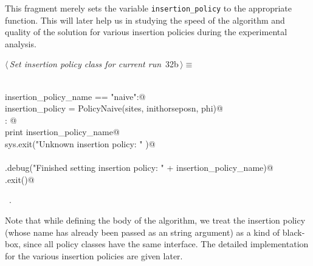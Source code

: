 \documentclass[11.5pt]{report}
\begin{document}
\newchunk This fragment merely sets the variable \verb|insertion_policy| to 
the appropriate function. This will later help us in studying the speed of 
the algorithm and quality of the solution for various insertion policies 
during the experimental analysis. 

\begin{flushleft} \small\label{scrap24}\raggedright\small
{} $\langle\,${\itshape Set insertion policy class for current run}\nobreak\ {\footnotesize {32b}}$\,\rangle\equiv$
\vspace{-1ex}
\begin{list}{}{} \item
\mbox{}\verb@@\\
\mbox{}\verb@if insertion_policy_name == "naive":@\\
\mbox{}\verb@     insertion_policy = PolicyNaive(sites, inithorseposn, phi)@\\
\mbox{}\verb@else: @\\
\mbox{}\verb@     print insertion_policy_name@\\
\mbox{}\verb@     sys.exit("Unknown insertion policy: " )@\\
\mbox{}\verb@@\\
\mbox{}\verb@logger.debug("Finished setting insertion policy: " + insertion_policy_name)@\\
\mbox{}\verb@sys.exit()@\\
\mbox{}\verb@@{\NWsep}
\end{list}
\vspace{-1.5ex}
\footnotesize
\begin{list}{}{\setlength{\itemsep}{-\parsep}\setlength{\itemindent}{-\leftmargin}}
\item \NWtxtMacroRefIn\ .

\item{}
\end{list}
\vspace{4ex}
\end{flushleft}
\newchunk Note that while defining the body of the algorithm, we treat the insertion policy 
(whose name has already been passed as an string argument) as a kind of black-box, since all 
policy classes have the same interface. The detailed implementation for the various 
insertion policies are given later. 
\end{document}
